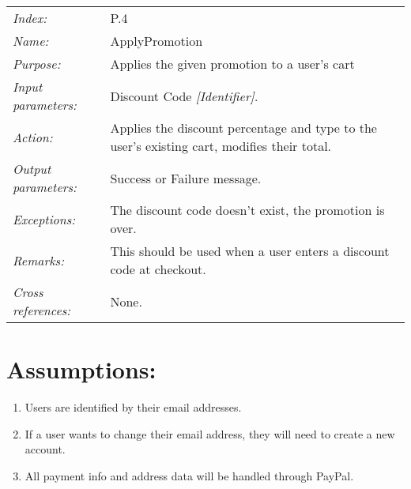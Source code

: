\documentclass[10pt,letter]{article}
\begin{document}
\begin{tabularx}{\textwidth}{l X}
    \it{Index:} & P.4 \\
    \it{Name:} & ApplyPromotion \\
    \it{Purpose:} & Applies the given promotion to a user's cart \\
    \it{Input parameters:} & Discount Code \it{[Identifier]}.\\
    \it{Action:} & Applies the discount percentage and type to the user's existing cart, modifies their total.\\
    \it{Output parameters:} & Success or Failure message. \\
    \it{Exceptions:} & The discount code doesn't exist, the promotion is over. \\
    \it{Remarks:} & This should be used when a user enters a discount code at checkout.\\
    \it{Cross references:} & None. \\
    \hline
\end{tabularx}

\section{Assumptions:}
\begin{enumerate}
    \item Users are identified by their email addresses.
    \item If a user wants to change their email address, they will need to create a new account.
    \item All payment info and address data will be handled through PayPal.
\end{enumerate}
\end{document}
